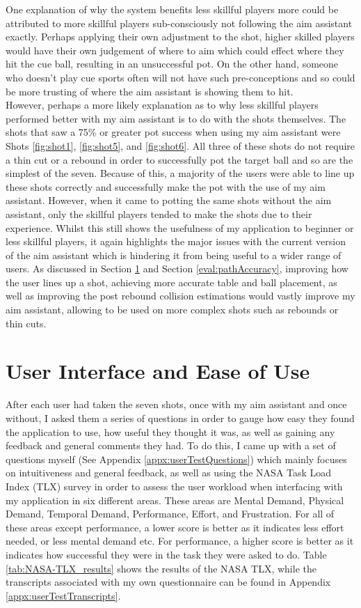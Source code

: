 \documentclass[ %
                author={Finn Alexander Wilkinson},
                supervisor={Dr. Andrew Calway},
                degree={MEng},
                title={\centering A Mixed Reality Aim Assistant for Pool and Snooker},
                subtitle={},
                type={Enterprise},
                year={2021} ]{dissertation}
\begin{document}
One explanation of why the system benefits less skillful players more could be attributed to more skillful players sub-consciously not following the aim assistant exactly. Perhaps applying their own adjustment to the shot, higher skilled players would have their own judgement of where to aim which could effect where they hit the cue ball, resulting in an unsuccessful pot. On the other hand, someone who doesn't play cue sports often will not have such pre-conceptions and so could be more trusting of where the aim assistant is showing them to hit. \\

However, perhaps a more likely explanation as to why less skillful players performed better with my aim assistant is to do with the shots themselves. The shots that saw a 75\% or greater pot success when using my aim assistant were Shots \ref{fig:shot1}, \ref{fig:shot5}, and \ref{fig:shot6}. All three of these shots do not require a thin cut or a rebound in order to successfully pot the target ball and so are the simplest of the seven. Because of this, a majority of the users were able to line up these shots correctly and successfully make the pot with the use of my aim assistant. However, when it came to potting the same shots without the aim assistant, only the skillful players tended to make the shots due to their experience. Whilst this still shows the usefulness of my application to beginner or less skillful players, it again highlights the major issues with the current version of the aim assistant which is hindering it from being useful to a wider range of users. As discussed in Section \ref{eval:UI} and Section \ref{eval:pathAccuracy}, improving how the user lines up a shot, achieving more accurate table and ball placement, as well as improving the post rebound collision estimations would vastly improve my aim assistant, allowing to be used on more complex shots such as rebounds or thin cuts.


\section{User Interface and Ease of Use}
\label{eval:UI}
After each user had taken the seven shots, once with my aim assistant and once without, I asked them a series of questions in order to gauge how easy they found the application to use, how useful they thought it was, as well as gaining any feedback and general comments they had. To do this, I came up with a set of questions myself (See Appendix \ref{appx:userTestQuestions}) which mainly focuses on intuitiveness and general feedback, as well as using the NASA Task Load Index (TLX) survey in order to assess the user workload when interfacing with my application in six different areas\cite{nasaTLX}. These areas are Mental Demand, Physical Demand, Temporal Demand, Performance, Effort, and Frustration. For all of these areas except performance, a lower score is better as it indicates less effort needed, or less mental demand etc. For performance, a higher score is better as it indicates how successful they were in the task they were asked to do. Table \ref{tab:NASA-TLX_results} shows the results of the NASA TLX, while the transcripts associated with my own questionnaire can be found in Appendix \ref{appx:userTestTranscripts}.
\end{document}
